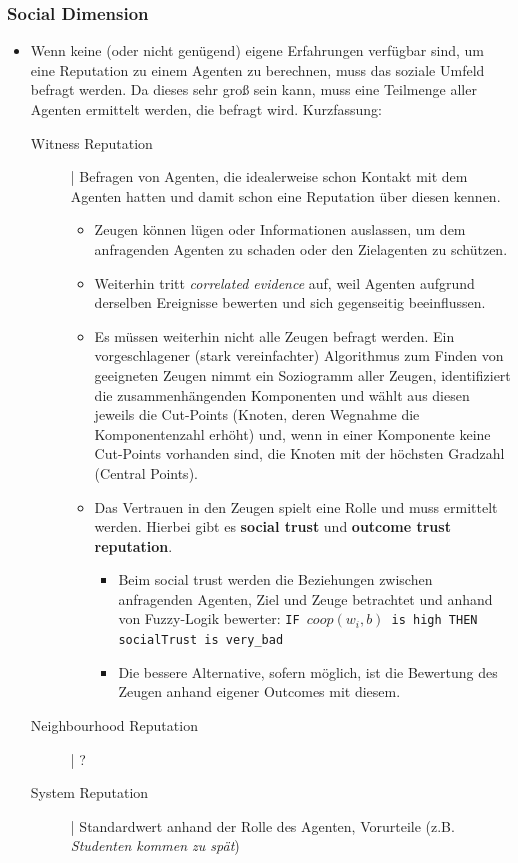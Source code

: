 \documentclass{article} %
\begin{document}
	\subsubsection{Social Dimension}
	\begin{itemize}
		\item Wenn keine (oder nicht genügend) eigene Erfahrungen verfügbar sind, um eine Reputation zu einem Agenten zu berechnen, muss das soziale Umfeld befragt werden.
		Da dieses sehr groß sein kann, muss eine Teilmenge aller Agenten ermittelt werden, die befragt wird. Kurzfassung:
		\begin{description}
			\item[Witness Reputation]| Befragen von Agenten, die idealerweise schon Kontakt mit dem Agenten hatten und damit schon eine Reputation über diesen kennen.
			\begin{itemize}
				\item Zeugen können lügen oder Informationen auslassen, um dem anfragenden Agenten zu schaden oder den Zielagenten zu schützen.
				\item Weiterhin tritt \emph{correlated evidence} auf, weil Agenten aufgrund derselben Ereignisse bewerten und sich gegenseitig beeinflussen.
				\item Es müssen weiterhin nicht alle Zeugen befragt werden.
				Ein vorgeschlagener (stark vereinfachter) Algorithmus zum Finden von geeigneten Zeugen nimmt ein Soziogramm aller Zeugen, identifiziert die zusammenhängenden Komponenten und wählt aus diesen jeweils die Cut-Points (Knoten, deren Wegnahme die Komponentenzahl erhöht) und, wenn in einer Komponente keine Cut-Points vorhanden sind, die Knoten mit der höchsten Gradzahl (Central Points).
				\item Das Vertrauen in den Zeugen spielt eine Rolle und muss ermittelt werden.
				Hierbei gibt es \textbf{social trust} und \textbf{outcome trust reputation}.
				\begin{itemize}
					\item Beim social trust werden die Beziehungen zwischen anfragenden Agenten, Ziel und Zeuge betrachtet und anhand von Fuzzy-Logik bewerter: \texttt{IF $coop(w_i,b)$ is high THEN socialTrust is very\_bad}
					\item Die bessere Alternative, sofern möglich, ist die Bewertung des Zeugen anhand eigener Outcomes mit diesem.
				\end{itemize}
			\end{itemize}
			\item[Neighbourhood Reputation]| ?
			\item[System Reputation]| Standardwert anhand der Rolle des Agenten, Vorurteile (z.B. \emph{Studenten kommen zu spät})
		\end{description}
	\end{itemize}
\end{document}
